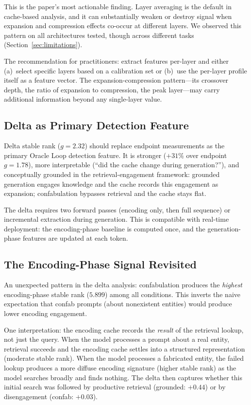 \documentclass[11pt,a4paper]{article}
\begin{document}
This is the paper's most actionable finding. Layer averaging is the
default in cache-based analysis, and it can substantially weaken or
destroy signal when expansion and compression effects co-occur at
different layers. We observed this pattern on all architectures
tested, though across different tasks
(Section~\ref{sec:limitations}).

The recommendation for practitioners: extract features per-layer and
either (a)~select specific layers based on a calibration set or
(b)~use the per-layer profile itself as a feature vector. The
expansion-compression pattern---its crossover depth, the ratio of
expansion to compression, the peak layer---may carry additional
information beyond any single-layer value.

\subsection{Delta as Primary Detection Feature}

Delta stable rank ($g = 2.32$) should replace endpoint measurements
as the primary Oracle Loop detection feature. It is stronger ($+31\%$
over endpoint $g = 1.78$), more interpretable (``did the cache
change during generation?''), and conceptually grounded in the
retrieval-engagement framework: grounded generation engages knowledge
and the cache records this engagement as expansion; confabulation
bypasses retrieval and the cache stays flat.

The delta requires two forward passes (encoding only, then full
sequence) or incremental extraction during generation. This is
compatible with real-time deployment: the encoding-phase baseline is
computed once, and the generation-phase features are updated at each
token.

\subsection{The Encoding-Phase Signal Revisited}

An unexpected pattern in the delta analysis: confabulation produces
the \emph{highest} encoding-phase stable rank ($5.899$) among all
conditions. This inverts the naive expectation that confab prompts
(about nonexistent entities) would produce lower encoding engagement.

One interpretation: the encoding cache records the \emph{result} of
the retrieval lookup, not just the query. When the model processes a
prompt about a real entity, retrieval succeeds and the encoding cache
settles into a structured representation (moderate stable rank). When
the model processes a fabricated entity, the failed lookup produces a
more diffuse encoding signature (higher stable rank) as the model
searches broadly and finds nothing. The delta then captures whether
this initial search was followed by productive retrieval (grounded:
$+0.44$) or by disengagement (confab: $+0.03$).
\end{document}
